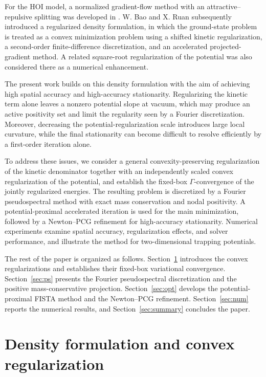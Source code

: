 \documentclass[11pt]{article}
\theoremstyle{plain}
\theoremstyle{definition}
\numberwithin{equation}{section}
\begin{document}
For the HOI model, a normalized gradient-flow method with an
attractive--repulsive splitting was developed in \cite{Ruan2018}.
W. Bao and X. Ruan \cite{BaoRuan2019} subsequently introduced a regularized
density formulation, in which the ground-state problem is treated as
a convex minimization problem using a shifted kinetic regularization,
a second-order finite-difference discretization, and an accelerated
projected-gradient method. A related square-root regularization of the
potential was also considered there as a numerical enhancement.

The present work builds on this density formulation with the aim of
achieving high spatial accuracy and high-accuracy stationarity.
Regularizing the kinetic term alone leaves a nonzero potential slope
at vacuum, which may produce an active positivity set and limit the
regularity seen by a Fourier discretization. Moreover, decreasing the
potential-regularization scale introduces large local curvature,
while the final stationarity can become difficult to resolve
efficiently by a first-order iteration alone.

To address these issues, we consider a general convexity-preserving
regularization of the kinetic denominator together with an
independently scaled convex regularization of the potential, and
establish the fixed-box $\Gamma$-convergence of the jointly regularized
energies. The resulting problem is discretized by a Fourier
pseudospectral method with exact mass conservation and nodal
positivity. A potential-proximal accelerated iteration is used for the
main minimization, followed by a Newton--PCG refinement for
high-accuracy stationarity. Numerical experiments examine spatial
accuracy, regularization effects, and solver performance, and
illustrate the method for two-dimensional trapping potentials.

The rest of the paper is organized as follows.
Section~\ref{sec:density} introduces the convex regularizations and
establishes their fixed-box variational convergence.
Section~\ref{sec:ps} presents the Fourier pseudospectral discretization
and the positive mass-conservative projection.
Section~\ref{sec:opt} develops the potential-proximal FISTA method and
the Newton--PCG refinement. Section~\ref{sec:num} reports the numerical
results, and Section~\ref{sec:summary} concludes the paper.

\section{Density formulation and convex regularization}
\label{sec:density}
\end{document}
